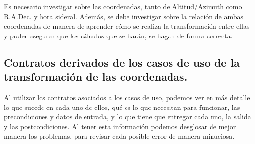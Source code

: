 \documentclass[letterpaper,spanish,10pt]{article}
\begin{document}
Es necesario investigar sobre las coordenadas, tanto de Altitud/Azimuth como R.A.Dec. y hora sideral. Adem\'as, se debe investigar sobre la relaci\'on de ambas coordenadas de manera de aprender c\'omo se realiza la transformaci\'on entre ellas y poder asegurar que los c\'alculos que se har\'an, se hagan de forma correcta.

\subsection{Contratos derivados de los casos de uso de la transformaci\'on de las coordenadas.}

Al utilizar los contratos asociados a los casos de uso, podemos ver en m\'as detalle lo que sucede en cada uno de ellos, qu\'e es lo que necesitan para funcionar, las precondiciones y datos de entrada, y lo que tiene que entregar cada uno, la salida y las postcondiciones. Al tener esta informaci\'on podemos desglosar de mejor manera los problemas, para revisar cada posible error de manera minuciosa.
\end{document}
